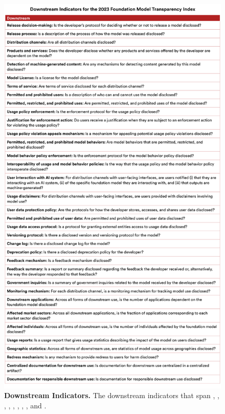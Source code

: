 \begin{figure}
\centering
\includegraphics[keepaspectratio, height=\textheight, width=\textwidth]{figures/indicators_list_downstream.pdf}
\caption{\textbf{Downstream Indicators.} 
The \numdownstreamindicators downstream indicators that span \distribution, \usagepolicy, \modelbehaviorpolicy, \interface, \dataprotection, \updates, \feedback, \impact, and \documentation.}
\label{fig:downstream-indicators}
\end{figure}

